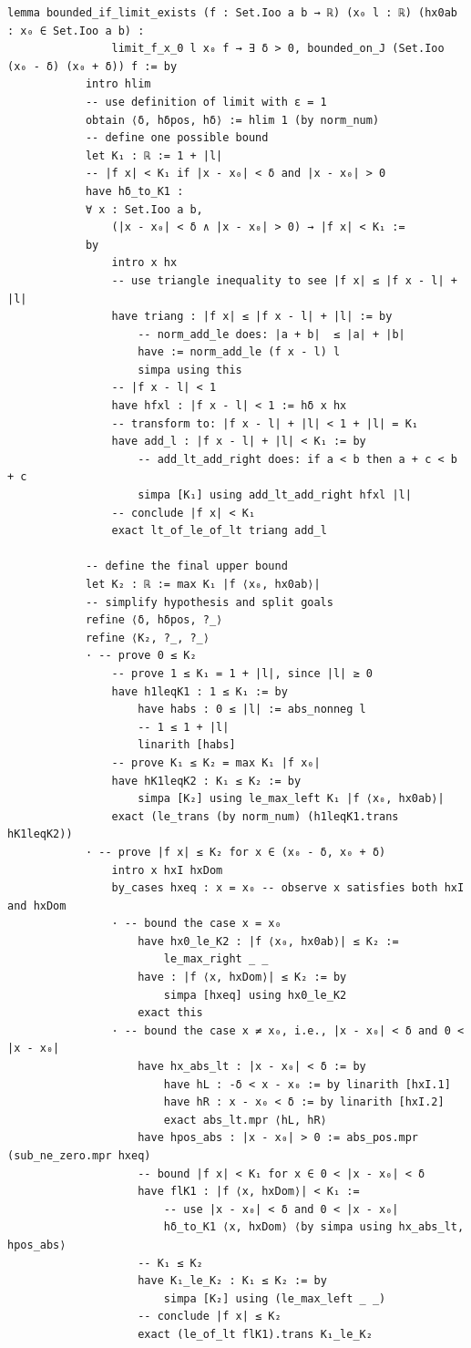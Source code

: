 \documentclass[a4paper,11pt]{article}
\theoremstyle{plain}
\begin{document}
	\begin{lstlisting}[caption={A function with limit at $x_0$ is bounded on some interval around $x_0$.}, label={list:8}]
		lemma bounded_if_limit_exists (f : Set.Ioo a b → ℝ) (x₀ l : ℝ) (hx0ab : x₀ ∈ Set.Ioo a b) :
				limit_f_x_0 l x₀ f → ∃ δ > 0, bounded_on_J (Set.Ioo (x₀ - δ) (x₀ + δ)) f := by
			intro hlim
			-- use definition of limit with ε = 1
			obtain ⟨δ, hδpos, hδ⟩ := hlim 1 (by norm_num)
			-- define one possible bound
			let K₁ : ℝ := 1 + |l|
			-- |f x| < K₁ if |x - x₀| < δ and |x - x₀| > 0
			have hδ_to_K1 :
			∀ x : Set.Ioo a b,
				(|x - x₀| < δ ∧ |x - x₀| > 0) → |f x| < K₁ :=
			by
				intro x hx
				-- use triangle inequality to see |f x| ≤ |f x - l| + |l|
				have triang : |f x| ≤ |f x - l| + |l| := by
					-- norm_add_le does: |a + b|  ≤ |a| + |b|
					have := norm_add_le (f x - l) l
					simpa using this
				-- |f x - l| < 1
				have hfxl : |f x - l| < 1 := hδ x hx
				-- transform to: |f x - l| + |l| < 1 + |l| = K₁
				have add_l : |f x - l| + |l| < K₁ := by
					-- add_lt_add_right does: if a < b then a + c < b + c
					simpa [K₁] using add_lt_add_right hfxl |l|
				-- conclude |f x| < K₁
				exact lt_of_le_of_lt triang add_l
			
			-- define the final upper bound
			let K₂ : ℝ := max K₁ |f ⟨x₀, hx0ab⟩|
			-- simplify hypothesis and split goals
			refine ⟨δ, hδpos, ?_⟩
			refine ⟨K₂, ?_, ?_⟩
			· -- prove 0 ≤ K₂
				-- prove 1 ≤ K₁ = 1 + |l|, since |l| ≥ 0
				have h1leqK1 : 1 ≤ K₁ := by
					have habs : 0 ≤ |l| := abs_nonneg l
					-- 1 ≤ 1 + |l|
					linarith [habs]
				-- prove K₁ ≤ K₂ = max K₁ |f x₀|
				have hK1leqK2 : K₁ ≤ K₂ := by
					simpa [K₂] using le_max_left K₁ |f ⟨x₀, hx0ab⟩|
				exact (le_trans (by norm_num) (h1leqK1.trans hK1leqK2))
			· -- prove |f x| ≤ K₂ for x ∈ (x₀ - δ, x₀ + δ)
				intro x hxI hxDom
				by_cases hxeq : x = x₀ -- observe x satisfies both hxI and hxDom
				· -- bound the case x = x₀
					have hx0_le_K2 : |f ⟨x₀, hx0ab⟩| ≤ K₂ :=
						le_max_right _ _
					have : |f ⟨x, hxDom⟩| ≤ K₂ := by
						simpa [hxeq] using hx0_le_K2
					exact this
				· -- bound the case x ≠ x₀, i.e., |x - x₀| < δ and 0 < |x - x₀|
					have hx_abs_lt : |x - x₀| < δ := by
						have hL : -δ < x - x₀ := by linarith [hxI.1]
						have hR : x - x₀ < δ := by linarith [hxI.2]
						exact abs_lt.mpr ⟨hL, hR⟩
					have hpos_abs : |x - x₀| > 0 := abs_pos.mpr (sub_ne_zero.mpr hxeq)
					-- bound |f x| < K₁ for x ∈ 0 < |x - x₀| < δ
					have flK1 : |f ⟨x, hxDom⟩| < K₁ :=
						-- use |x - x₀| < δ and 0 < |x - x₀|
						hδ_to_K1 ⟨x, hxDom⟩ ⟨by simpa using hx_abs_lt, hpos_abs⟩
					-- K₁ ≤ K₂
					have K₁_le_K₂ : K₁ ≤ K₂ := by
						simpa [K₂] using (le_max_left _ _)
					-- conclude |f x| ≤ K₂
					exact (le_of_lt flK1).trans K₁_le_K₂
	\end{lstlisting}
	
\end{document}

